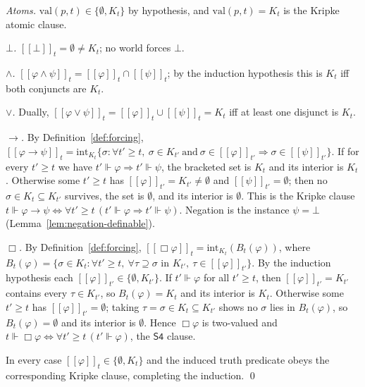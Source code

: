 \documentclass[final,12pt]{elsarticle}
\newcommand{\llbracket}{[\![}
\newcommand{\rrbracket}{]\!]}
\theoremstyle{plain}
\theoremstyle{definition}
\begin{document}
\emph{Atoms.} \(\mathrm{val}(p,t)\in\{\emptyset,K_t\}\) by hypothesis, and
\(\mathrm{val}(p,t)=K_t\) is the Kripke atomic clause.

\emph{\(\bot\).} \(\llbracket\bot\rrbracket_t=\emptyset\neq K_t\); no world forces
\(\bot\).

\emph{\(\wedge\).} \(\llbracket\varphi\wedge\psi\rrbracket_t
=\llbracket\varphi\rrbracket_t\cap\llbracket\psi\rrbracket_t\); by the induction
hypothesis this is \(K_t\) iff both conjuncts are \(K_t\).

\emph{\(\vee\).} Dually, \(\llbracket\varphi\vee\psi\rrbracket_t
=\llbracket\varphi\rrbracket_t\cup\llbracket\psi\rrbracket_t=K_t\) iff at least one
disjunct is \(K_t\).

\emph{\(\to\).} By Definition~\ref{def:forcing},
\(\llbracket\varphi\to\psi\rrbracket_t
=\mathrm{int}_{K_t}\{\sigma:\forall t'\ge t,\ \sigma\in K_{t'}\ \text{and}\
\sigma\in\llbracket\varphi\rrbracket_{t'}\Rightarrow\sigma\in\llbracket\psi\rrbracket_{t'}\}\).
If for every \(t'\ge t\) we have \(t'\Vdash\varphi\Rightarrow t'\Vdash\psi\), the
bracketed set is \(K_t\) and its interior is \(K_t\). Otherwise some \(t'\ge t\)
has \(\llbracket\varphi\rrbracket_{t'}=K_{t'}\neq\emptyset\) and
\(\llbracket\psi\rrbracket_{t'}=\emptyset\); then no \(\sigma\in K_t\subseteq K_{t'}\)
survives, the set is \(\emptyset\), and its interior is \(\emptyset\). This is the
Kripke clause \(t\Vdash\varphi\to\psi\iff\forall t'\ge t\,(t'\Vdash\varphi\Rightarrow
t'\Vdash\psi)\). Negation is the instance \(\psi=\bot\)
(Lemma~\ref{lem:negation-definable}).

\emph{\(\Box\).} By Definition~\ref{def:forcing},
\(\llbracket\Box\varphi\rrbracket_t=\mathrm{int}_{K_t}(B_t(\varphi))\), where
\(B_t(\varphi)=\{\sigma\in K_t:\forall t'\ge t,\ \forall\tau\supseteq\sigma
\text{ in }K_{t'},\ \tau\in\llbracket\varphi\rrbracket_{t'}\}\). By the induction
hypothesis each \(\llbracket\varphi\rrbracket_{t'}\in\{\emptyset,K_{t'}\}\). If
\(t'\Vdash\varphi\) for all \(t'\ge t\), then \(\llbracket\varphi\rrbracket_{t'}=K_{t'}\)
contains every \(\tau\in K_{t'}\), so \(B_t(\varphi)=K_t\) and its interior is
\(K_t\). Otherwise some \(t'\ge t\) has \(\llbracket\varphi\rrbracket_{t'}=\emptyset\);
taking \(\tau=\sigma\in K_t\subseteq K_{t'}\) shows no \(\sigma\) lies in
\(B_t(\varphi)\), so \(B_t(\varphi)=\emptyset\) and its interior is \(\emptyset\).
Hence \(\Box\varphi\) is two-valued and \(t\Vdash\Box\varphi\iff\forall t'\ge t\,
(t'\Vdash\varphi)\), the \(\mathsf{S4}\) clause.

In every case \(\llbracket\varphi\rrbracket_t\in\{\emptyset,K_t\}\) and the induced
truth predicate obeys the corresponding Kripke clause, completing the induction.
\qed
\end{document}
